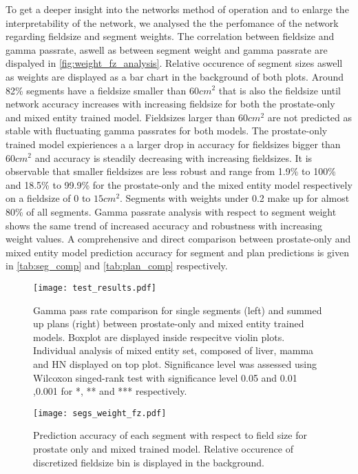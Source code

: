 To get a deeper insight into the networks method of operation and to enlarge the interpretability of the network, we analysed the the perfomance of the network regarding fieldsize and segment weights. 
The correlation between fieldsize and gamma passrate, aswell as between segment weight and gamma passrate are dispalyed in \autoref{fig:weight_fz_analysis}. 
Relative occurence of segment sizes aswell as weights are displayed as a bar chart in the background of both plots.
Around 82\% segments have a fieldsize smaller than $60 cm^2$ that is also the fieldsize until network accuracy increases with increasing fieldsize for both the prostate-only and mixed entity trained model.
Fieldsizes larger than $60 cm^2$ are not predicted as stable with fluctuating gamma passrates for both models.
The prostate-only trained model expieriences a a larger drop in accuracy for fieldsizes bigger than $60 cm^2$ and accuracy is steadily decreasing with increasing fieldsizes. 
It is observable that smaller fieldsizes are less robust and range from 1.9\% to 100\% and 18.5\% to 99.9\% for the prostate-only and the mixed entity model respectively on a fieldsize of 0 to $15 cm^2$.
Segments with weights under 0.2 make up for almost 80\% of all segments. Gamma passrate analysis with respect to segment weight shows the same trend of increased accuracy and robustness with increasing weight values.
A comprehensive and direct comparison between prostate-only and mixed entity model prediction accuracy for segment and plan predictions is given in \autoref{tab:seg_comp} and \autoref{tab:plan_comp} respectively.

\begin{figure}
    \centering
    \texttt{[image: test\_results.pdf]}
    \caption{
        Gamma pass rate comparison for single segments (left) and summed up plans (right) between prostate-only and mixed entity trained models. 
        Boxplot are displayed inside respecitve violin plots. 
        Individual analysis of mixed entity set, composed of liver, mamma and \acs{HN} displayed on top plot. 
        Significance level was assessed using Wilcoxon singed-rank test with significance level 0.05 and 0.01 ,0.001 for *, ** and *** respectively. 
    }\label{fig:comparison}
\end{figure}

\begin{figure}
    \centering
    \texttt{[image: segs\_weight\_fz.pdf]}
    \caption{
        Prediction accuracy of each segment with respect to field size for prostate only and mixed trained model. 
        Relative occurence of discretized fieldsize bin is displayed in the background.}\label{fig:weight_fz_analysis}
\end{figure}

